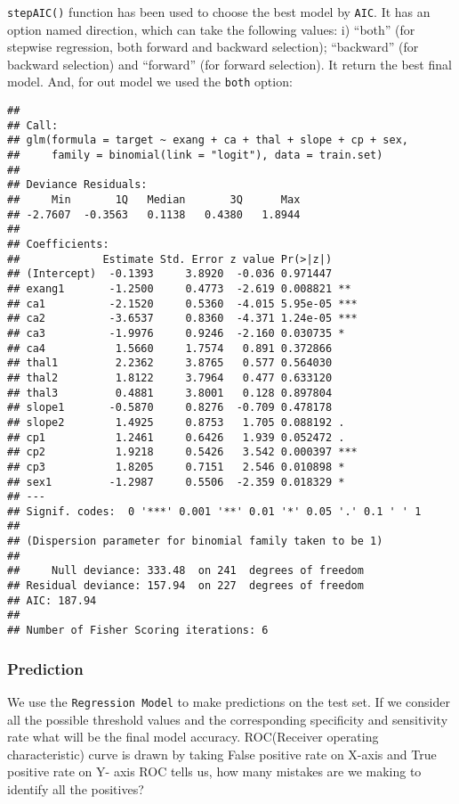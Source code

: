 \documentclass[]{article}
\begin{document}
\texttt{stepAIC()} function has been used to choose the best model by
\texttt{AIC}. It has an option named direction, which can take the
following values: i) ``both'' (for stepwise regression, both forward and
backward selection); ``backward'' (for backward selection) and
``forward'' (for forward selection). It return the best final model.
And, for out model we used the \texttt{both} option:

\begin{verbatim}
## 
## Call:
## glm(formula = target ~ exang + ca + thal + slope + cp + sex, 
##     family = binomial(link = "logit"), data = train.set)
## 
## Deviance Residuals: 
##     Min       1Q   Median       3Q      Max  
## -2.7607  -0.3563   0.1138   0.4380   1.8944  
## 
## Coefficients:
##             Estimate Std. Error z value Pr(>|z|)    
## (Intercept)  -0.1393     3.8920  -0.036 0.971447    
## exang1       -1.2500     0.4773  -2.619 0.008821 ** 
## ca1          -2.1520     0.5360  -4.015 5.95e-05 ***
## ca2          -3.6537     0.8360  -4.371 1.24e-05 ***
## ca3          -1.9976     0.9246  -2.160 0.030735 *  
## ca4           1.5660     1.7574   0.891 0.372866    
## thal1         2.2362     3.8765   0.577 0.564030    
## thal2         1.8122     3.7964   0.477 0.633120    
## thal3         0.4881     3.8001   0.128 0.897804    
## slope1       -0.5870     0.8276  -0.709 0.478178    
## slope2        1.4925     0.8753   1.705 0.088192 .  
## cp1           1.2461     0.6426   1.939 0.052472 .  
## cp2           1.9218     0.5426   3.542 0.000397 ***
## cp3           1.8205     0.7151   2.546 0.010898 *  
## sex1         -1.2987     0.5506  -2.359 0.018329 *  
## ---
## Signif. codes:  0 '***' 0.001 '**' 0.01 '*' 0.05 '.' 0.1 ' ' 1
## 
## (Dispersion parameter for binomial family taken to be 1)
## 
##     Null deviance: 333.48  on 241  degrees of freedom
## Residual deviance: 157.94  on 227  degrees of freedom
## AIC: 187.94
## 
## Number of Fisher Scoring iterations: 6
\end{verbatim}

\hypertarget{prediction}{%
\subsubsection{Prediction}\label{prediction}}

We use the \texttt{Regression\ Model} to make predictions on the test
set. If we consider all the possible threshold values and the
corresponding specificity and sensitivity rate what will be the final
model accuracy. ROC(Receiver operating characteristic) curve is drawn by
taking False positive rate on X-axis and True positive rate on Y- axis
ROC tells us, how many mistakes are we making to identify all the
positives?
\end{document}

